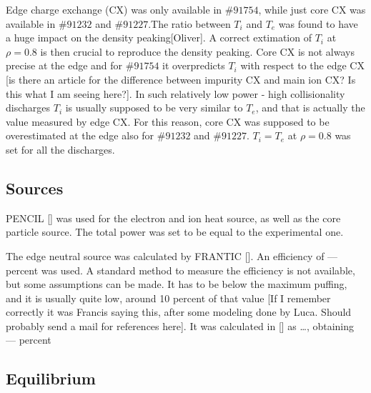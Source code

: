 \documentclass[a4paper,10pt]{iopart}
\begin{document}
Edge charge exchange (CX) was only available in $\#91754$, while just core CX was available in $\#91232$ and $\#91227$.The ratio between $T_{i}$ and $T_{e}$ was found to have a huge impact on the density peaking[Oliver]. A correct extimation of $T_{i}$ at $ \rho = 0.8 $ is then crucial to reproduce the density peaking. Core CX is not always precise at the edge and for $\#91754$ it overpredicts $T_{i}$ with respect to the edge CX [is there an article for the difference between impurity CX and main ion CX? Is this what I am seeing here?]. In such relatively low power - high collisionality discharges $T_{i}$ is usually supposed to be very similar to $T_{e}$, and that is actually the value measured by edge CX. For this reason, core CX was supposed to be overestimated at the edge also for $\#91232$ and $\#91227$. $T_{i} = T_{e}$ at $ \rho = 0.8 $ was set for all the discharges.

\subsection{Sources}

PENCIL [] was used for the electron and ion heat source, as well as the core particle source. The total power was set to be equal to the experimental one.

The edge neutral source was calculated by FRANTIC []. An efficiency of --- percent was used. A standard method to measure the efficiency is not available, but some assumptions can be made. It has to be below the maximum puffing, and it is usually quite low, around 10 percent of that value [If I remember correctly it was Francis saying this, after some modeling done by Luca. Should probably send a mail for references here]. It was calculated in [] as …, obtaining --- percent%

\subsection{Equilibrium}
\end{document}
